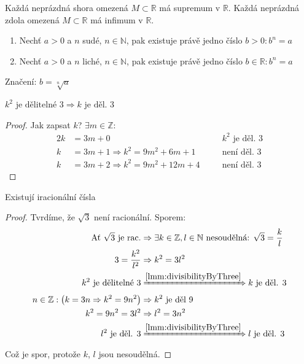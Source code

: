 \begin{definitionAi}[name=Supremum a infimum, label=def:A3]
	Každá neprázdná shora omezená $M\subset\mathbb{R}$ má supremum v $\mathbb{R}$.
	Každá neprázdná zdola omezená $M\subset\mathbb{R}$ má infimum v $\mathbb{R}$.
\end{definitionAi}

\begin{definition}[name=Odmocnina, label=def:sqrt]\noindent
	\begin{enumerate}
		\item Nechť $a>0$ a $n$ sudé, $n\in\mathbb{N}$, pak existuje právě jedno číslo $b>0: b^n=a$
		\item Nechť $a>0$ a $n$ liché, $n\in\mathbb{N}$, pak existuje právě jedno číslo $b\in\mathbb{R}: b^n=a$
	\end{enumerate}
	Značení: $b=\sqrt[n]{a}$
\end{definition}

\begin{lemmaAlph}[name=Čtverec dělitelný třema, label=lmm:divisibilityByThree]
	$k^2 \text{ je dělitelné }3\Rightarrow k \text{ je děl. }3$
\end{lemmaAlph}
\begin{proof}
	Jak zapsat $k$? $\exists m\in\mathbb{Z}:$
	\begin{alignat}{2}
		k &= 3m+0 &&k^2\text{ je děl. $3$}\\
		k &= 3m+1 \Rightarrow k^2=9m^2+6m+1 \quad&&\text{není děl. $3$} \\
		k &= 3m+2 \Rightarrow k^2=9m^2+12m+4 \quad&&\text{není děl. $3$}
	\end{alignat}
\end{proof}

\begin{theorem}
	Existují iracionální čísla
\end{theorem}
\begin{proof}
	Tvrdíme, že $\sqrt{3}$ není racionální. Sporem:
	\begin{alignat}{1}
		\text{Ať $\sqrt{3}$ je rac.} &\Rightarrow\exists k\in\mathbb{Z}, l\in\mathbb{N}
			\text{ nesoudělná: }\sqrt{3}=\frac{k}{l} \\
		3=\frac{k^2}{l^2} &\Rightarrow k^2=3l^2 \\
		k^2 \text{ je dělitelné }3 &\xRightarrow{\autoref{lmm:divisibilityByThree}} k\text{ je děl. }3 \\
		n\in\mathbb{Z}: \left(k=3n\Rightarrow k^2=9n^2\right) &\Rightarrow k^2 \text{ je děl }9 \\
		k^2=9n^2=3l^2 &\Rightarrow l^2=3n^2 \\
		l^2 \text{ je děl. }3 &\xRightarrow{\autoref{lmm:divisibilityByThree}} l\text{ je děl. }3
	\end{alignat}
	Což je spor, protože $k$, $l$ jsou nesoudělná.
\end{proof}

